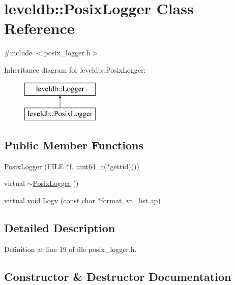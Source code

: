 \hypertarget{classleveldb_1_1_posix_logger}{}\section{leveldb\+:\+:Posix\+Logger Class Reference}
\label{classleveldb_1_1_posix_logger}


{\ttfamily \#include $<$posix\+\_\+logger.\+h$>$}

Inheritance diagram for leveldb\+:\+:Posix\+Logger\+:\begin{figure}[H]
\begin{center}
\leavevmode
\includegraphics[height=2.000000cm]{classleveldb_1_1_posix_logger}
\end{center}
\end{figure}
\subsection*{Public Member Functions}
\begin{DoxyCompactItemize}
\item 
\hyperlink{classleveldb_1_1_posix_logger_a9c498babc43c3cfb5f863a252ce5d1d1}{Posix\+Logger} (F\+I\+L\+E $\ast$f, \hyperlink{stdint_8h_aaa5d1cd013383c889537491c3cfd9aad}{uint64\+\_\+t}($\ast$gettid)())
\item 
virtual \hyperlink{classleveldb_1_1_posix_logger_aa6fcbf43fa8feae2a9c25721b13b37ba}{$\sim$\+Posix\+Logger} ()
\item 
virtual void \hyperlink{classleveldb_1_1_posix_logger_ae7b521716a3e54c4be187806a81ccf6b}{Logv} (const char $\ast$format, va\+\_\+list ap)
\end{DoxyCompactItemize}


\subsection{Detailed Description}


Definition at line 19 of file posix\+\_\+logger.\+h.



\subsection{Constructor \& Destructor Documentation}
\hypertarget{classleveldb_1_1_posix_logger_a9c498babc43c3cfb5f863a252ce5d1d1}{}
